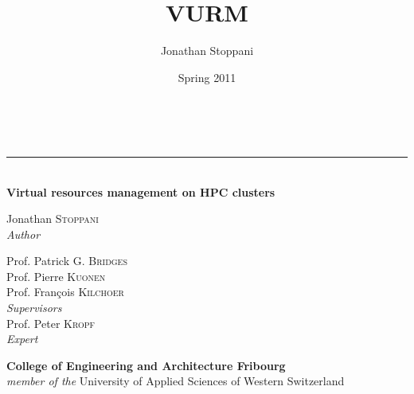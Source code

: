 \title{VURM}
\author{Jonathan Stoppani}
\date{Spring 2011}

\begin{titlepage}

\vspace*{1cm}
\begin{center}

\\[0.3cm]

\rule{\linewidth}{0.75pt}\\[0.3cm]

{\Large \textbf{Virtual resources management on HPC clusters}}

\end{center}

\vspace*{4cm}

\noindent\begin{minipage}[t]{0.5\textwidth}
	\begin{flushleft} \Large
		Jonathan \textsc{Stoppani}\\
		{\small\emph{Author}}
	\end{flushleft}
\end{minipage}
\begin{minipage}[t]{0.5\textwidth}
	\begin{flushright} \Large
		Prof. Patrick G. \textsc{Bridges}\\[.1cm]
		Prof. Pierre \textsc{Kuonen}\\[.1cm]
		Prof. François \textsc{Kilchoer}\\
		{\small\emph{Supervisors}}\\[1cm]
		
		Prof. Peter \textsc{Kropf}\\
		{\small\emph{Expert}}\\[1cm]
	\end{flushright}
\end{minipage}

\vfill


\vfill

\noindent \textbf{College of Engineering and Architecture Fribourg}\\[.1cm]
\textit{member of the} University of Applied Sciences of Western Switzerland

\vspace*{.433cm}


\end{titlepage}
